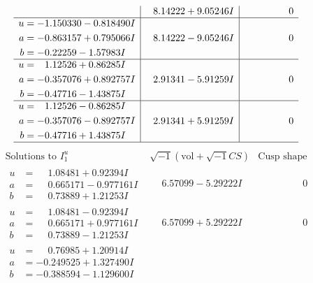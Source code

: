 \documentclass[1p]{elsarticle_modified}
\theoremstyle{definition}
\newcommand{\I}{\sqrt{-1}}
\begin{document}
$$\begin{array}{c|c|c}
 & \phantom{-}8.14222 + 9.05246 I & \phantom{-0.000000 } 0 \\ \hline\begin{aligned}
u &= -1.150330 - 0.818490 I \\
a &= -0.863157 + 0.795066 I \\
b &= -0.22259 - 1.57983 I\end{aligned}
 & \phantom{-}8.14222 - 9.05246 I & \phantom{-0.000000 } 0 \\ \hline\begin{aligned}
u &= \phantom{-}1.12526 + 0.86285 I \\
a &= -0.357076 + 0.892757 I \\
b &= -0.47716 - 1.43875 I\end{aligned}
 & \phantom{-}2.91341 - 5.91259 I & \phantom{-0.000000 } 0 \\ \hline\begin{aligned}
u &= \phantom{-}1.12526 - 0.86285 I \\
a &= -0.357076 - 0.892757 I \\
b &= -0.47716 + 1.43875 I\end{aligned}
 & \phantom{-}2.91341 + 5.91259 I & \phantom{-0.000000 } 0\\
 \hline 
 \end{array}$$\newpage$$\begin{array}{c|c|c}  
\text{Solutions to }I^u_{1}& \I (\text{vol} + \sqrt{-1}CS) & \text{Cusp shape}\\
 \hline 
\begin{aligned}
u &= \phantom{-}1.08481 + 0.92394 I \\
a &= \phantom{-}0.665171 - 0.977161 I \\
b &= \phantom{-}0.73889 + 1.21253 I\end{aligned}
 & \phantom{-}6.57099 - 5.29222 I & \phantom{-0.000000 } 0 \\ \hline\begin{aligned}
u &= \phantom{-}1.08481 - 0.92394 I \\
a &= \phantom{-}0.665171 + 0.977161 I \\
b &= \phantom{-}0.73889 - 1.21253 I\end{aligned}
 & \phantom{-}6.57099 + 5.29222 I & \phantom{-0.000000 } 0 \\ \hline\begin{aligned}
u &= \phantom{-}0.76985 + 1.20914 I \\
a &= -0.249525 + 1.327490 I \\
b &= -0.388594 - 1.129600 I\end{aligned}

\end{array}$$
\end{document}

